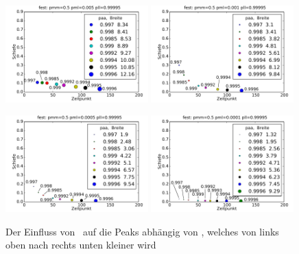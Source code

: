 \begin{figure}[H]
\includegraphics[width=0.49\textwidth]{bilder/paa/3fest_05_0005_p_099995}
\includegraphics[width=0.49\textwidth]{bilder/paa/3fest_05_0001_p_099995}

\vspace*{5pt}

\includegraphics[width=0.49\textwidth]{bilder/paa/3fest_05_00005_p_099995}
\includegraphics[width=0.49\textwidth]{bilder/paa/3fest_05_00001_p_099995}
\caption[Der Einfluss von \paa\ auf die Peaks abhängig von \pml]{Der Einfluss von \paa\ auf die Peaks abhängig von \pml, welches von links oben nach rechts unten kleiner wird}
\label{einfluss_paa_pml}
\end{figure}

